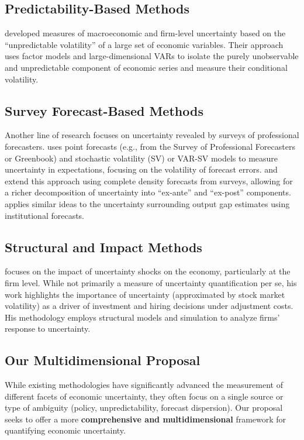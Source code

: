 \documentclass[5p,authoryear]{elsarticle}
\begin{document}
\subsection*{Predictability-Based Methods}
\cite{jurado2015} developed measures of macroeconomic and firm-level uncertainty based on the ``unpredictable volatility'' of a large set of economic variables. Their approach uses factor models and large-dimensional VARs to isolate the purely unobservable and unpredictable component of economic series and measure their conditional volatility.

\subsection*{Survey Forecast-Based Methods}
Another line of research focuses on uncertainty revealed by surveys of professional forecasters. \cite{clark2017} uses point forecasts (e.g., from the Survey of Professional Forecasters or Greenbook) and stochastic volatility (SV) or VAR-SV models to measure uncertainty in expectations, focusing on the volatility of forecast errors. \cite{carriero2018} and \cite{rossi2016} extend this approach using complete density forecasts from surveys, allowing for a richer decomposition of uncertainty into ``ex-ante'' and ``ex-post'' components. \cite{berge2020} applies similar ideas to the uncertainty surrounding output gap estimates using institutional forecasts.

\subsection*{Structural and Impact Methods}
\cite{bloomuncer} focuses on the impact of uncertainty shocks on the economy, particularly at the firm level. While not primarily a measure of uncertainty quantification per se, his work highlights the importance of uncertainty (approximated by stock market volatility) as a driver of investment and hiring decisions under adjustment costs. His methodology employs structural models and simulation to analyze firms' response to uncertainty.

\subsection*{Our Multidimensional Proposal}

While existing methodologies have significantly advanced the measurement of different facets of economic uncertainty, they often focus on a single source or type of ambiguity (policy, unpredictability, forecast dispersion). Our proposal seeks to offer a more \textbf{comprehensive and multidimensional} framework for quantifying economic uncertainty.
\end{document}
